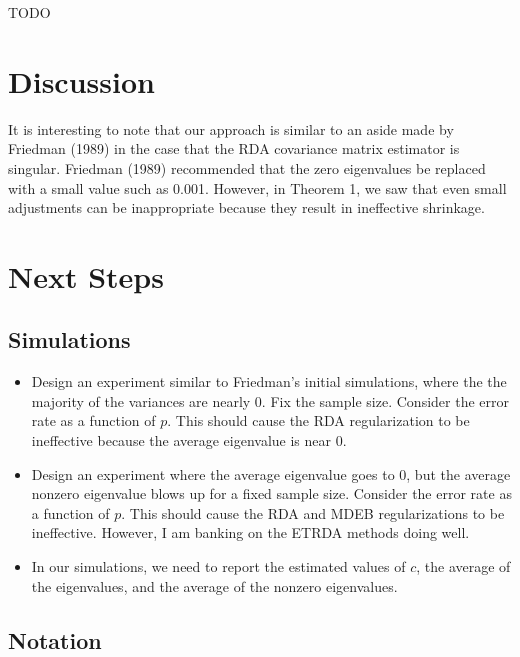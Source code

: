 \documentclass[11pt]{article}
\begin{document}
TODO

\section{Discussion}

It is interesting to note that our approach is similar to an aside made by Friedman (1989) in the case that the RDA covariance matrix estimator is singular. Friedman (1989) recommended that the zero eigenvalues be replaced with a small value such as 0.001. However, in Theorem 1, we saw that even small adjustments can be inappropriate because they result in ineffective shrinkage.

\section{Next Steps}

\subsection{Simulations}

\begin{itemize}
	\item  Design an experiment similar to Friedman's initial simulations, where the the majority of the variances are nearly 0. Fix the sample size. Consider the error rate as a function of $p$. This should cause the RDA regularization to be ineffective because the average eigenvalue is near 0.
	
	\item  Design an experiment where the average eigenvalue goes to 0, but the average nonzero eigenvalue blows up for a fixed sample size. Consider the error rate as a function of $p$. This should cause the RDA and MDEB regularizations to be ineffective. However, I am banking on the ETRDA methods doing well.
	
	\item In our simulations, we need to report the estimated values of $c$, the average of the eigenvalues, and the average of the nonzero eigenvalues.

\end{itemize}

\subsection{Notation}
\end{document}
